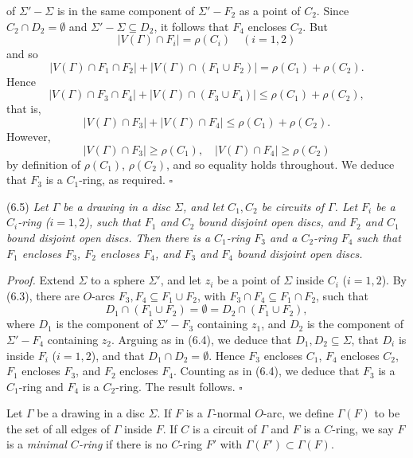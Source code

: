\noindent of $\Sigma' - \Sigma$ is in the same component of $\Sigma' - F_2$ as a point of $C_2$. Since $C_2 \cap D_2 = \emptyset$ and $\Sigma' - \Sigma \subseteq D_2$, it follows that $F_4$ encloses $C_2$. But
\begin{equation*}
|V(\Gamma) \cap F_i| = \rho(C_i) \quad (i = 1, 2)
\end{equation*}
and so
\begin{equation*}
|V(\Gamma) \cap F_1 \cap F_2| + |V(\Gamma) \cap (F_1 \cup F_2)| = \rho(C_1) + \rho(C_2).
\end{equation*}
Hence
\begin{equation*}
|V(\Gamma) \cap F_3 \cap F_4| + |V(\Gamma) \cap (F_3 \cup F_4)| \le \rho(C_1) + \rho(C_2),
\end{equation*}
that is,
\begin{equation*}
|V(\Gamma) \cap F_3| + |V(\Gamma) \cap F_4| \le \rho(C_1) + \rho(C_2).
\end{equation*}
However,
\begin{equation*}
|V(\Gamma) \cap F_3| \ge \rho(C_1), \quad |V(\Gamma) \cap F_4| \ge \rho(C_2)
\end{equation*}
by definition of $\rho(C_1)$, $\rho(C_2)$, and so equality holds throughout. We deduce that $F_3$ is a $C_1$-ring, as required. $\square$

\stmt
(6.5) \textit{Let $\Gamma$ be a drawing in a disc $\Sigma$, and let $C_1, C_2$ be circuits of $\Gamma$. Let $F_i$ be a $C_i$-ring ($i = 1, 2$), such that $F_1$ and $C_2$ bound disjoint open discs, and $F_2$ and $C_1$ bound disjoint open discs. Then there is a $C_1$-ring $F_3$ and a $C_2$-ring $F_4$ such that $F_1$ encloses $F_3$, $F_2$ encloses $F_4$, and $F_3$ and $F_4$ bound disjoint open discs.}

\textit{Proof.} Extend $\Sigma$ to a sphere $\Sigma'$, and let $z_i$ be a point of $\Sigma$ inside $C_i$ ($i = 1, 2$). By (6.3), there are $O$-arcs $F_3, F_4 \subseteq F_1 \cup F_2$, with $F_3 \cap F_4 \subseteq F_1 \cap F_2$, such that
\begin{equation*}
D_1 \cap (F_1 \cup F_2) = \emptyset = D_2 \cap (F_1 \cup F_2),
\end{equation*}
where $D_1$ is the component of $\Sigma' - F_3$ containing $z_1$, and $D_2$ is the component of $\Sigma' - F_4$ containing $z_2$. Arguing as in (6.4), we deduce that $D_1, D_2 \subseteq \Sigma$, that $D_i$ is inside $F_i$ ($i = 1, 2$), and that $D_1 \cap D_2 = \emptyset$. Hence $F_3$ encloses $C_1$, $F_4$ encloses $C_2$, $F_1$ encloses $F_3$, and $F_2$ encloses $F_4$. Counting as in (6.4), we deduce that $F_3$ is a $C_1$-ring and $F_4$ is a $C_2$-ring. The result follows. $\square$

Let $\Gamma$ be a drawing in a disc $\Sigma$. If $F$ is a $\Gamma$-normal $O$-arc, we define $\Gamma(F)$ to be the set of all edges of $\Gamma$ inside $F$. If $C$ is a circuit of $\Gamma$ and $F$ is a $C$-ring, we say $F$ is a \textit{minimal $C$-ring} if there is no $C$-ring $F'$ with $\Gamma(F') \subset \Gamma(F)$.
